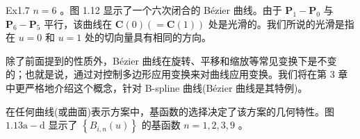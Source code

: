 \documentclass[../main.tex]{subfiles}
\begin{document}
\noindent\begin{minipage}{\linewidth}
Ex1.7 \(n = 6\) 。图 1.12 显示了一个六次闭合的 Bézier 曲线。由于 \({\mathbf{P}}_{1} - {\mathbf{P}}_{0}\) 与 \({\mathbf{P}}_{6} - {\mathbf{P}}_{5}\) 平行，该曲线在 \(\mathbf{C}\left( 0\right) \left( { = \mathbf{C}\left( 1\right) }\right)\) 处是光滑的。我们所说的光滑是指在 \(u = 0\) 和 \(u = 1\) 处的切向量具有相同的方向。

\begin{center}
\begin{minipage}{7cm}
\centering
{}
\captionsetup{font=small,skip=6pt,justification=centering}
\end{minipage}
\end{center}
\end{minipage}
\par\medskip

除了前面提到的性质外，Bézier 曲线在旋转、平移和缩放等常见变换下是不变的；也就是说，通过对控制多边形应用变换来对曲线应用变换。我们将在第 3 章中更严格地介绍这个概念，针对 B-spline 曲线(Bézier 曲线是其特例)。


\noindent\begin{minipage}{\linewidth}
在任何曲线(或曲面)表示方案中，基函数的选择决定了该方案的几何特性。图 \({1.13}\mathrm{a} - \mathrm{d}\) 显示了 \(\left\{  {{B}_{i,n}\left( u\right) }\right\}\) 的基函数 \(n = 1,2,3,9\) 。

\begin{center}
\begin{minipage}{12.1cm}
\centering
\begin{minipage}[t]{5.8cm}\centering
{}
\end{minipage}\hspace{.5cm}%
\begin{minipage}[t]{5.8cm}\centering
{}
\end{minipage}
\par\vspace{3mm}
\begin{minipage}[t]{5.8cm}\centering
{}
\end{minipage}\hspace{.5cm}%
\begin{minipage}[t]{5.8cm}\centering
{}
\end{minipage}
\par\vspace{3mm}
\captionsetup{font=small,skip=6pt,justification=centering}
\end{minipage}
\end{center}
\end{minipage}
\par\medskip
\end{document}
